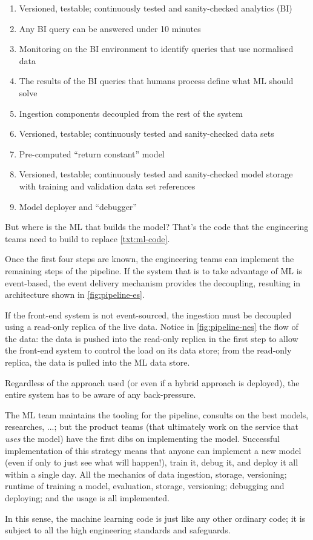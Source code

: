 \begin{enumerate}
  \item Versioned, testable; continuously tested and sanity-checked analytics (BI)  
  \item Any BI query can be answered under 10 minutes
  \item Monitoring on the BI environment to identify queries that use normalised data
  \item The results of the BI queries that humans process define what ML should solve
  \item Ingestion components decoupled from the rest of the system
  \item Versioned, testable; continuously tested and sanity-checked data sets 
  \label{txt:ml-code}\item Pre-computed ``return constant'' model
  \item Versioned, testable; continuously tested and sanity-checked model storage with training and validation data set references
  \item Model deployer and ``debugger''
\end{enumerate}

But where is the ML that builds the model? That's the code that the engineering teams need to build to replace \autoref{txt:ml-code}. 

Once the first four steps are known, the engineering teams can implement the remaining steps of the pipeline. If the system that is to take advantage of ML is event-based, the event delivery mechanism provides the decoupling, resulting in architecture shown in \autoref{fig:pipeline-es}.


If the front-end system is not event-sourced, the ingestion must be decoupled using a read-only replica of the live data. Notice in \autoref{fig:pipeline-nes} the flow of the data: the data is pushed into the read-only replica in the first step to allow the front-end system to control the load on its data store; from the read-only replica, the data is pulled into the ML data store. 


Regardless of the approach used (or even if a hybrid approach is deployed), the entire system has to be aware of any back-pressure.

The ML team maintains the tooling for the pipeline, consults on the best models, researches, ...; but the product teams (that ultimately work on the service that \emph{uses} the model) have the first dibs on implementing the model. Successful implementation of this strategy means that anyone can implement a new model (even if only to just see what will happen!), train it, debug it, and deploy it all within a single day. All the mechanics of data ingestion, storage, versioning; runtime of training a model, evaluation, storage, versioning; debugging and deploying; and the usage is all implemented. 

In this sense, the machine learning code is just like any other ordinary code; it is subject to all the high engineering standards and safeguards.


